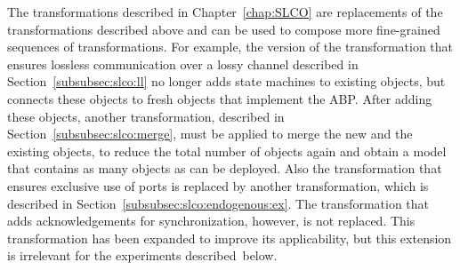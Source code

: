 The transformations described in Chapter~\ref{chap:SLCO} are replacements of the transformations described above and can be used to compose more fine-grained sequences of transformations.
For example, the version of the transformation that ensures lossless communication over a lossy channel described in Section~\ref{subsubsec:slco:ll} no longer adds state machines to existing objects, but connects these objects to fresh objects that implement the ABP.
After adding these objects, another transformation, described in Section~\ref{subsubsec:slco:merge}, must be applied to merge the new and the existing objects, to reduce the total number of objects again and obtain a model that contains as many objects as can be deployed.
Also the transformation that ensures exclusive use of ports is replaced by another transformation, which is described in Section~\ref{subsubsec:slco:endogenous:ex}.
The transformation that adds acknowledgements for synchronization, however, is not replaced.
This transformation has been expanded to improve its applicability, but this extension is irrelevant for the experiments described~below. 